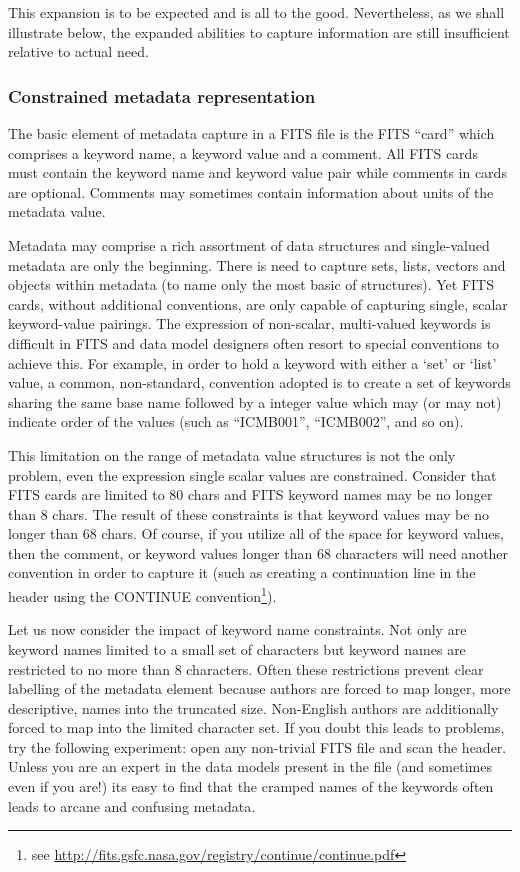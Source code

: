 \documentclass[final,authoryear,5p,times,twocolumn]{elsarticle}
\begin{document}
This expansion is to be expected and is all to the good. Nevertheless,
as we shall illustrate below, the expanded abilities to capture
information are still insufficient relative to actual need.


\subsubsection{Constrained metadata representation}


The basic element of metadata capture in a FITS file is the FITS
``card'' which comprises a keyword name, a keyword value and a
comment. All FITS cards must contain the keyword name and keyword
value pair while comments in cards are optional. Comments may
sometimes contain information about units of the metadata value.


Metadata may comprise a rich assortment of data structures and
single-valued metadata are only the beginning. There is need to
capture sets, lists, vectors and objects within metadata (to name only
the most basic of structures). Yet FITS cards, without additional
conventions, are only capable of capturing single, scalar
keyword-value pairings. The expression of non-scalar, multi-valued
keywords is difficult in FITS and data model designers often resort to
special conventions to achieve this. For example, in order to hold a
keyword with either a `set' or `list' value, a common, non-standard,
convention adopted is to create a set of keywords sharing the same
base name followed by a integer value which may (or may not) indicate
order of the values (such as ``ICMB001'', ``ICMB002'', and so on).


This limitation on the range of metadata value structures is not the
only problem, even the expression single scalar values are
constrained. Consider that FITS cards are limited to 80 chars and FITS
keyword names may be no longer than 8 chars. The result of these
constraints is that keyword values may be no longer than 68 chars. Of
course, if you utilize all of the space for keyword values, then the
comment, or keyword values longer than 68 characters will need another
convention in order to capture it (such as creating a continuation
line in the header using the CONTINUE convention\footnote{see \url{http://fits.gsfc.nasa.gov/registry/continue/continue.pdf}}).


Let us now consider the impact of keyword name constraints. Not only
are keyword names limited to a small set of characters but keyword
names are restricted to no more than 8 characters. Often these
restrictions prevent clear labelling of the metadata element because
authors are forced to map longer, more descriptive, names into the
truncated size. Non-English authors are additionally forced to map
into the limited character set. If you doubt this leads to problems,
try the following experiment: open any non-trivial FITS file and scan
the header. Unless you are an expert in the data models present in the
file (and sometimes even if you are!) its easy to find that the
cramped names of the keywords often leads to arcane and confusing
metadata.
\end{document}
